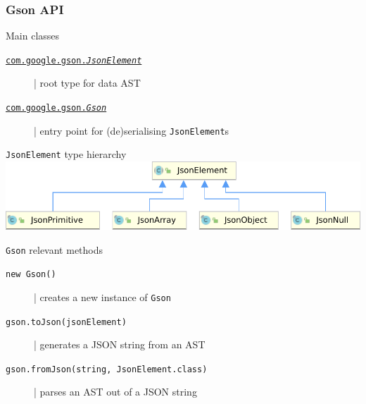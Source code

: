 \documentclass[presentation]{beamer}\mode<presentation>{\usetheme{AMSCesenaPurpleAndGold}}
\begin{document}
\begin{frame}[allowframebreaks]
    \frametitle{Gson API}

    \begin{block}{Main classes}
        \begin{description}
            \item[\href{https://www.javadoc.io/doc/com.google.code.gson/gson/latest/com.google.gson/com/google/gson/JsonElement.html}{\texttt{com.google.gson.\textit{JsonElement}}}] | root type for data AST
            \item[\href{https://www.javadoc.io/doc/com.google.code.gson/gson/latest/com.google.gson/com/google/gson/Gson.html}{\texttt{com.google.gson.\textit{Gson}}}] | entry point for (de)serialising \texttt{JsonElement}s
        \end{description}
    \end{block}

    \begin{exampleblock}{\texttt{JsonElement} type hierarchy}
        \centering
        \includegraphics[width=.5\linewidth]{./img/JsonElementCompact.pdf}
    \end{exampleblock}

    \begin{block}{\texttt{Gson} relevant methods}
        \begin{description}
            \item[\texttt{new Gson()}] | creates a new instance of \texttt{Gson}
            \item[\texttt{gson.toJson(jsonElement)}] | generates a JSON string from an AST  
            \item[\texttt{gson.fromJson(string, JsonElement.class)}] | parses an AST out of a JSON string   
        \end{description}
    \end{block}


\end{frame}
\end{document}
